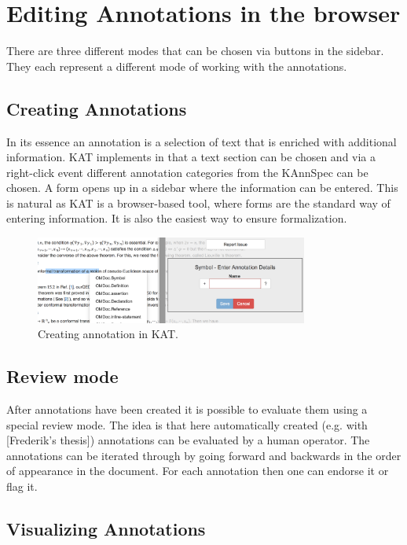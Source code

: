 \section{Editing Annotations in the browser}

There are three different modes that can be chosen via buttons in the sidebar. They each represent a different mode of working with the annotations.


\subsection{Creating Annotations}
In its essence an annotation is a selection of text that is enriched with additional information. KAT implements in that a text section can be chosen and via a right-click event different annotation categories from the KAnnSpec can be chosen. A form opens up in a sidebar where the information can be entered. This is natural as KAT is a browser-based tool, where forms are the standard way of entering information. It is also the easiest way to ensure formalization.

\begin{figure}[htbp]
 \centering
 \includegraphics[width=0.8\textwidth]{annotation_creation.png}
 \caption{Creating annotation in KAT.}
\end{figure}

\subsection{Review mode}
After annotations have been created it is possible to evaluate them using a special review mode. The idea is that here automatically created (e.g. with [Frederik's thesis]) annotations can be evaluated by a human operator. The annotations can be iterated through by going forward and backwards in the order of appearance in the document. For each annotation then one can endorse it or flag it.

\subsection{Visualizing Annotations}
